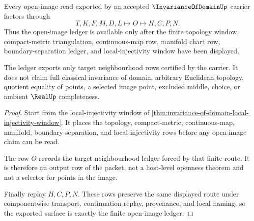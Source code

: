 \begin{theorem}
\label{thm:invariance-of-domain-open-image-ledger}
Every open-image read exported by an accepted $\InvarianceOfDomainUp$ carrier factors through
$$
T,K,F,M,D,L\longmapsto O\longmapsto H,C,P,N .
$$
Thus the open-image ledger is available only after the finite topology window, compact-metric triangulation, continuous-map row, manifold chart row, boundary-separation ledger, and local-injectivity window have been displayed.

The ledger exports only target neighbourhood rows certified by the carrier. It does not claim full classical invariance of domain, arbitrary Euclidean topology, quotient equality of points, a selected image point, excluded middle, choice, or ambient $\RealUp$ completeness.
\end{theorem}
\begin{proof}
Start from the local-injectivity window of \autoref{thm:invariance-of-domain-local-injectivity-window}. It places the topology, compact-metric, continuous-map, manifold, boundary-separation, and local-injectivity rows before any open-image claim can be read.

The row $O$ records the target neighbourhood ledger forced by that finite route. It is therefore an output row of the packet, not a host-level openness theorem and not a selector for points in the image.

Finally replay $H,C,P,N$. These rows preserve the same displayed route under componentwise transport, continuation replay, provenance, and local naming, so the exported surface is exactly the finite open-image ledger.
\end{proof}




